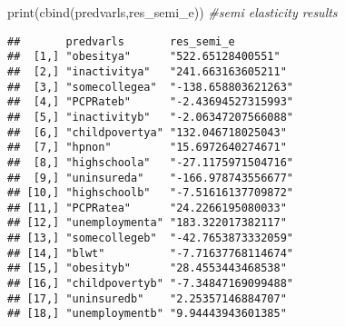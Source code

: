 \documentclass[
]{article}
\newenvironment{Shaded}{\begin{snugshade}}{\end{snugshade}}
\newcommand{\CommentTok}[1]{\textcolor[rgb]{0.56,0.35,0.01}{\textit{#1}}}
\newcommand{\FunctionTok}[1]{\textcolor[rgb]{0.00,0.00,0.00}{#1}}
\newcommand{\NormalTok}[1]{#1}
\begin{document}
\begin{Shaded}
\begin{Highlighting}[]
\FunctionTok{print}\NormalTok{(}\FunctionTok{cbind}\NormalTok{(predvarls,res\_semi\_e)) }\CommentTok{\#semi elasticity results}
\end{Highlighting}
\end{Shaded}

\begin{verbatim}
##       predvarls       res_semi_e         
##  [1,] "obesitya"      "522.65128400551"  
##  [2,] "inactivitya"   "241.663163605211" 
##  [3,] "somecollegea"  "-138.658803621263"
##  [4,] "PCPRateb"      "-2.43694527315993"
##  [5,] "inactivityb"   "-2.06347207566088"
##  [6,] "childpovertya" "132.046718025043" 
##  [7,] "hpnon"         "15.6972640274671" 
##  [8,] "highschoola"   "-27.1175971504716"
##  [9,] "uninsureda"    "-166.978743556677"
## [10,] "highschoolb"   "-7.51616137709872"
## [11,] "PCPRatea"      "24.2266195080033" 
## [12,] "unemploymenta" "183.322017382117" 
## [13,] "somecollegeb"  "-42.7653873332059"
## [14,] "blwt"          "-7.71637768114674"
## [15,] "obesityb"      "28.4553443468538" 
## [16,] "childpovertyb" "-7.34847169099488"
## [17,] "uninsuredb"    "2.25357146884707" 
## [18,] "unemploymentb" "9.94443943601385"
\end{verbatim}
\end{document}
